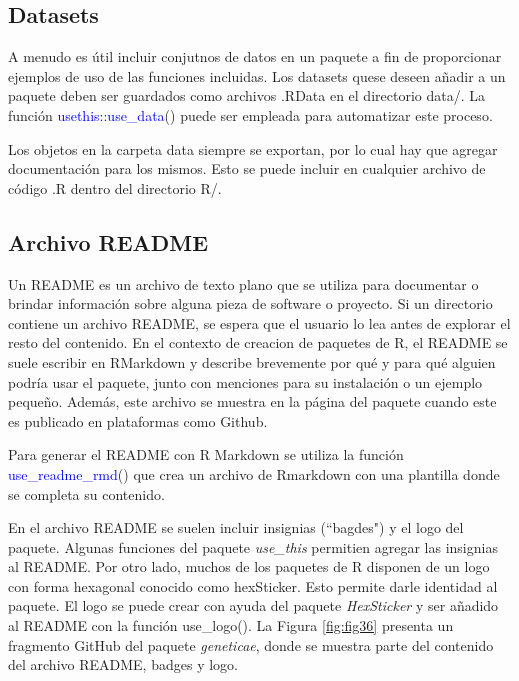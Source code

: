 \subsection{Datasets}

A menudo es útil incluir conjutnos de datos en un paquete a fin de proporcionar ejemplos de uso de las funciones incluidas. Los datasets quese deseen añadir a un paquete deben ser guardados como archivos .RData en el directorio data/. La función \textcolor{blue}{usethis::use\_data}() puede ser empleada para automatizar este proceso.

Los objetos en la carpeta data siempre se exportan, por lo cual hay que agregar documentación para los mismos. Esto se puede incluir en cualquier archivo de código .R dentro del directorio R/. 


\subsection{Archivo README}

Un README es un archivo de texto plano que se utiliza para documentar o brindar información sobre alguna pieza de software o proyecto. Si un directorio contiene un archivo README, se espera que el usuario lo lea antes de explorar el resto del contenido. En el contexto de creacion de paquetes de R, el README se suele escribir en RMarkdown y describe brevemente por qué y para qué alguien podría usar el paquete, junto con menciones para su instalación o un ejemplo pequeño. Además,  este archivo se muestra en la página del paquete cuando este es publicado en plataformas como Github. 

Para generar el README con R Markdown se utiliza la función \textcolor{blue}{use\_readme\_rmd}() que crea un archivo de Rmarkdown con una plantilla donde se completa su contenido. 

En el archivo README se suelen incluir insignias (``bagdes") y el logo del paquete. Algunas funciones del paquete \emph{use\_this} permitien agregar las insignias al README. Por otro lado, muchos de los paquetes de R disponen de un logo con forma hexagonal conocido como hexSticker. Esto permite darle identidad al paquete. El logo se puede crear con ayuda del paquete \emph{HexSticker} y ser añadido al README con la función use\_logo(). La Figura \ref{fig:fig36} presenta un fragmento GitHub del paquete \emph{geneticae}, donde se muestra parte del contenido del archivo README, badges y logo.

